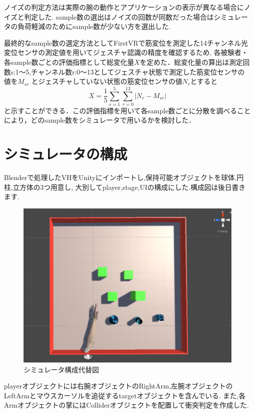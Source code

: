 \documentclass{ltjsreport}
\begin{document}
		ノイズの判定方法は実際の腕の動作とアプリケーションの表示が異なる場合にノイズと判定した.
		sample数の選出はノイズの回数が同数だった場合はシミュレータの負荷軽減のためにsample数が少ない方を選出した.

		最終的なsample数の選定方法としてFirstVRで筋変位を測定した14チャンネル光変位センサの測定値を用いてジェスチャ認識の精度を確認するため,
		各被験者・各sample数ごとの評価指標として総変化量$X$を定めた．総変化量の算出は測定回数s:1～5,チャンネル数r:0～13としてジェスチャ状態で測定した筋変位センサの値を$M_{{s}{r}}$
		とジェスチャしていない状態の筋変位センサの値$N_{r}$とすると
		\begin{equation}
			X = \frac{1}{5} \sum_{s = 1}^{5} \sum_{r = 0}^{13} |N_{r} - M_{{s}{r}}|
		\end{equation}
		と示すことができる．この評価指標を用いて各sample数ごとに分散を調べることにより，どのsample数をシミュレータで用いるかを検討した．
	
	\section{シミュレータの構成}
		Blenderで処理したVHをUnityにインポートし,保持可能オブジェクトを球体,円柱,立方体の3つ用意し,
		大別してplayer,stage,UIの構成にした.構成図は後日書きます.
		\begin{figure}[H]
		\centering
		\includegraphics[width = 12cm]{../figs/fieldup.png}
		\caption{シミュレータ構成代替図}
		\label{fig:simuraterconst}
		\end{figure}
		playerオブジェクトには右腕オブジェクトのRightArm,左腕オブジェクトのLeftArmとマウスカーソルを追従するtargetオブジェクトを含んでいる.
		また,各Armオブジェクトの掌にはColliderオブジェクトを配置して衝突判定を作成した.
\end{document}
